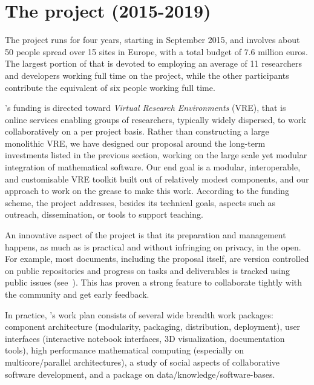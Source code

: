 \section{The \ODK project (2015-2019)}\label{sec:odk}

The \ODK project runs for four years, starting in September 2015, and
involves about 50 people spread over 15 sites in Europe, with a total
budget of 7.6 million euros. The largest portion of that is devoted to
employing an average of 11 researchers and developers working full
time on the project, while the other participants contribute the
equivalent of six people working full time.

\ODK's funding is directed toward \emph{Virtual Research Environments}
(VRE), that is online services enabling groups of researchers,
typically widely dispersed, to work collaboratively on a per project
basis. Rather than constructing a large monolithic VRE, we have
designed our proposal around the long-term investments listed in the
previous section, working on the large scale yet modular integration
of mathematical software. Our end goal is a modular, interoperable,
and customisable VRE toolkit built out of relatively modest
components, and our approach to work on the grease to make this
work. According to the funding scheme, the project addresses, besides
its technical goals, aspects such as outreach, dissemination, or tools
to support teaching.

An innovative aspect of the \ODK project is that its preparation and management happens,
as much as is practical and without infringing on privacy, in the open. For example, most
documents, including the proposal itself, are version controlled on public repositories
and progress on tasks and deliverables is tracked using public issues
(see~\cite{OpenDreamKit:on}). This has proven a strong feature to collaborate tightly with
the community and get early feedback.

In practice, \ODK's work plan consists of several wide breadth work packages: component architecture (modularity, packaging, distribution, deployment), user interfaces (\Jupyter interactive notebook interfaces, 3D visualization, documentation tools), high performance mathematical computing (especially on multicore/parallel architectures), a study of social aspects of collaborative software development, and a package on data/knowledge/software-bases.

